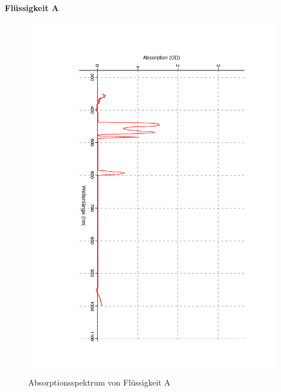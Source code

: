 \documentclass[12pt,a4paper]{article}
\begin{document}
\textbf{Flüssigkeit A}

\begin{figure}[H]
	\centering
	\includegraphics[scale=0.5,angle = 90,trim = 20mm 20mm 20mm 20mm]{./data/Spektro/Absorbtion_A_DO_4.pdf}
	\caption{Absorptionsspektrum von Flüssigkeit A}
	\label{fig:AbsorbtionA}
\end{figure}
\end{document}
